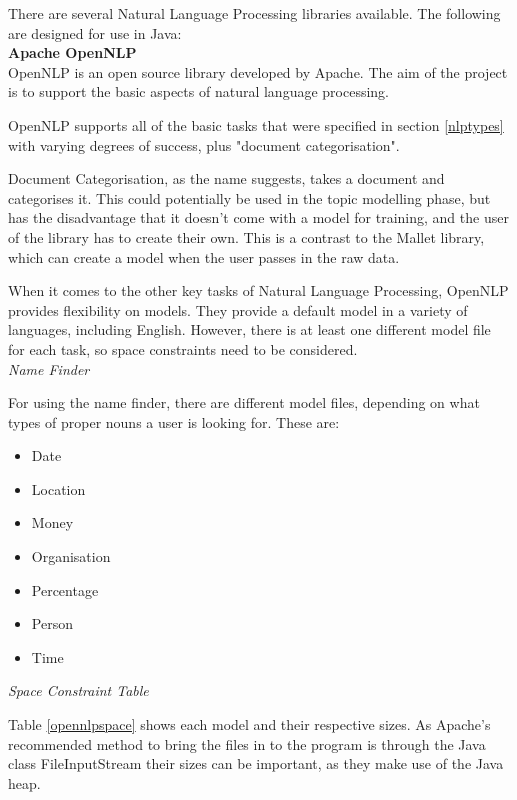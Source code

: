 \documentclass[12pt]{article}
\begin{document}
\label{nlp}

There are several Natural Language Processing libraries available. The following are designed for use in Java: \\

\textbf{Apache OpenNLP} \\

OpenNLP is an open source library developed by Apache. The aim of the project is to support the basic aspects of natural language processing.

OpenNLP supports all of the basic tasks that were specified in section \ref{nlptypes} with varying degrees of success, plus "document categorisation".

Document Categorisation, as the name suggests, takes a document and categorises it. This could potentially be used in the topic modelling phase, but has the disadvantage that it doesn't come with a model for training, and the user of the library has to create their own. This is a contrast to the Mallet library, which can create a model when the user passes in the raw data.

When it comes to the other key tasks of Natural Language Processing, OpenNLP provides flexibility on models. They provide a default model in a variety of languages, including English. However, there is at least one different model file for each task, so space constraints need to be considered. \\

\emph{Name Finder}

For using the name finder, there are different model files, depending on what types of proper nouns a user is looking for. These are: 

\begin{itemize}
	\item Date
	\item Location
	\item Money
	\item Organisation
	\item Percentage
	\item Person
	\item Time \\
\end{itemize} 

\emph{Space Constraint Table}

Table \ref{opennlpspace} shows each model and their respective sizes. As Apache's recommended method to bring the files in to the program is through the Java class FileInputStream their sizes can be important, as they make use of the Java heap.
\end{document}
